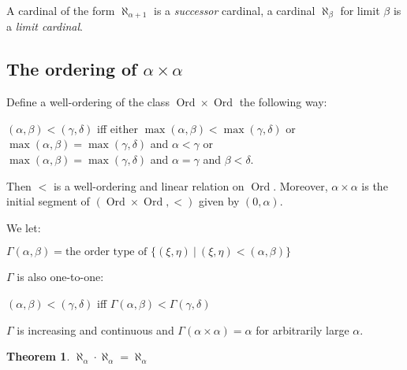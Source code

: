 \documentclass[8pt]{article}
\theoremstyle{definition}
\theoremstyle{definition}
\newtheorem{theorem}{Theorem}[section]
\theoremstyle{definition}
\theoremstyle{definition}
\theoremstyle{definition}
\theoremstyle{definition}
\theoremstyle{definition}
\theoremstyle{definition}
\theoremstyle{definition}
\theoremstyle{definition}
\theoremstyle{definition}
\theoremstyle{definition}
\theoremstyle{definition}
\theoremstyle{definition}
\theoremstyle{question}
\begin{document}
A cardinal of the form $\aleph_{\alpha + 1}$ is a \emph{successor} cardinal, 
a cardinal $\aleph_{\beta}$ for limit $\beta$ is a \emph{limit cardinal}.

\subsection{The ordering of $\alpha \times \alpha$}

Define a well-ordering of the class $\operatorname{Ord} \times \operatorname{Ord}$ the following way:

\begin{center}
  $(\alpha, \beta) < (\gamma, \delta)$ iff either $\max(\alpha, \beta) < \max(\gamma, \delta)$ or \\ $\max(\alpha, \beta) = \max(\gamma, \delta)$ and $\alpha < \gamma$ or \\ $\max(\alpha, \beta) = \max(\gamma, \delta)$ and $\alpha = \gamma$ and $\beta < \delta$.
\end{center}

Then $<$ is a well-ordering and linear relation on $\operatorname{Ord}$. 
Moreover, $\alpha \times \alpha$ is the initial segment of $(\operatorname{Ord} \times \operatorname{Ord}, <)$ given by $(0, \alpha)$.

We let:

\begin{center}
  $\Gamma(\alpha, \beta) = \text{the order type of } \{ (\xi, \eta) \: | \: (\xi, \eta) < (\alpha, \beta) \}$
\end{center}

$\Gamma$ is also one-to-one:
\begin{center}
  $(\alpha, \beta) < (\gamma, \delta)$ iff $\Gamma(\alpha, \beta) < \Gamma(\gamma, \delta)$
\end{center}

$\Gamma$ is increasing and continuous and $\Gamma(\alpha \times \alpha) = \alpha$ for arbitrarily large $\alpha$.

\begin{theorem}
  $\aleph_{\alpha} \cdot \aleph_{\alpha} = \aleph_{\alpha}$
\end{theorem}
\end{document}
